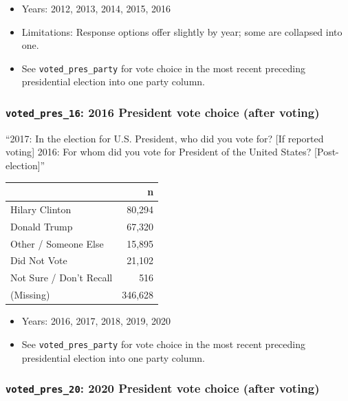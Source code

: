 \documentclass[10pt,article,oneside]{memoir}
\theoremstyle{definition}
\begin{document}
\begin{itemize}
\tightlist
\item
  Years: 2012, 2013, 2014, 2015, 2016
\item
  Limitations: Response options offer slightly by year; some are
  collapsed into one.
\item
  See \texttt{voted\_pres\_party} for vote choice in the most recent
  preceding presidential election into one party column.
\end{itemize}

\hypertarget{voted_pres_16-2016-president-vote-choice-after-voting}{%
\subsubsection{\texorpdfstring{\texttt{voted\_pres\_16}: 2016 President
vote choice (after
voting)}{voted\_pres\_16: 2016 President vote choice (after voting)}}\label{voted_pres_16-2016-president-vote-choice-after-voting}}

``2017: In the election for U.S. President, who did you vote for? {[}If
reported voting{]} 2016: For whom did you vote for President of the
United States? {[}Post-election{]}''

\begin{table}[H]
\centering
\begin{tabular}{lr}
\toprule
 & n\\
\midrule
Hilary Clinton & 80,294\\
Donald Trump & 67,320\\
Other / Someone Else & 15,895\\
Did Not Vote & 21,102\\
Not Sure / Don't Recall & 516\\
(Missing) & 346,628\\
\bottomrule
\end{tabular}
\end{table}

\begin{itemize}
\tightlist
\item
  Years: 2016, 2017, 2018, 2019, 2020
\item
  See \texttt{voted\_pres\_party} for vote choice in the most recent
  preceding presidential election into one party column.
\end{itemize}

\hypertarget{voted_pres_20-2020-president-vote-choice-after-voting}{%
\subsubsection{\texorpdfstring{\texttt{voted\_pres\_20}: 2020 President
vote choice (after
voting)}{voted\_pres\_20: 2020 President vote choice (after voting)}}\label{voted_pres_20-2020-president-vote-choice-after-voting}}
\end{document}

